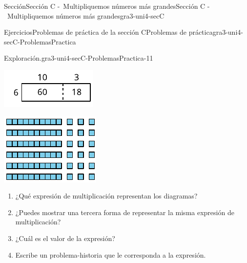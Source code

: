 \documentclass[twoside,10pt,]{article}
\begin{document}
\begin{sectionptx}{Sección}{Sección C -~Multipliquemos números más grandes}{}{Sección C -~Multipliquemos números más grandes}{}{}{gra3-uni4-secC}
\begin{exercises-subsection}{Ejercicios}{Problemas de práctica de la sección C}{}{Problemas de práctica}{}{}{gra3-uni4-secC-ProblemasPractica}
\begin{divisionexercise}{9}{Exploración.}{}{gra3-uni4-secC-ProblemasPractica-11}
\begin{sidebyside}{2}{0.025}{0.025}{0.05}%
\begin{sbspanel}{0.45}%
\includegraphics[width=\linewidth]{external/svg-source/tikz-file-151680.pdf}
\end{sbspanel}%
\begin{sbspanel}{0.45}%
\includegraphics[width=\linewidth]{external/svg-source/tikz-file-151681.pdf}
\end{sbspanel}%
\end{sidebyside}%
%
\begin{enumerate}[label=(\alph*)]
\item{}¿Qué expresión de multiplicación representan los diagramas?%
\item{}¿Puedes mostrar una tercera forma de representar la misma expresión de multiplicación?%
\item{}¿Cuál es el valor de la expresión?%
\item{}Escribe un problema-historia que le corresponda a la expresión.%
\end{enumerate}
\end{divisionexercise}%

\end{exercises-subsection}
\end{sectionptx}
\end{document}

